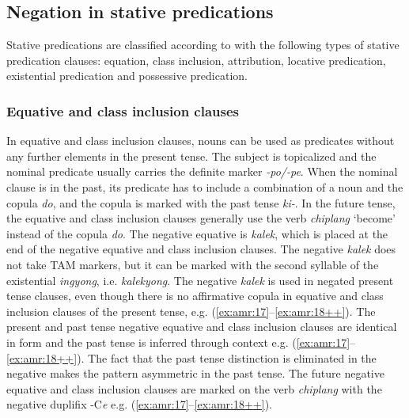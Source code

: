 \documentclass[output=paper,colorlinks,citecolor=brown]{langscibook}
\begin{document}
\subsection{Negation in stative predications}\label{sec:amr:2.3}
Stative predications are classified according to \citet[111]{Payne1997} with the following types of stative predication clauses: equation, class inclusion, attribution, locative predication, existential predication and possessive predication.

\subsubsection{Equative and class inclusion clauses}\label{sec:amr:2.3.1}
In equative and class inclusion clauses, nouns can be used as predicates without any further elements in the present tense. The subject is topicalized and the nominal predicate usually carries the definite marker \textit{{}-po/-pe}. When the nominal clause is in the past, its predicate has to include a combination of a noun and the copula \textit{do}, and the copula is marked with the past tense \textit{ki-}. In the future tense, the equative and class inclusion clauses generally use the verb \textit{chiplang} ‘become’ instead of the copula \textit{do}. The negative equative is \textit{kalek}, which is placed at the end of the negative equative and class inclusion clauses. The negative \textit{kalek} does not take TAM markers, but it can be marked with the second syllable of the existential \textit{ingyong}, i.e. \textit{kalekyong}. The negative \textit{kalek} is used in negated present tense clauses, even though there is no affirmative copula in equative and class inclusion clauses of the present tense, e.g. (\ref{ex:amr:17}--\ref{ex:amr:18++}). The present and past tense negative equative and class inclusion clauses are identical in form and the past tense is inferred through context e.g. (\ref{ex:amr:17}--\ref{ex:amr:18++}). The fact that the past tense distinction is eliminated in the negative makes the pattern asymmetric in the past tense. The future negative equative and class inclusion clauses are marked on the verb \textit{chiplang} with the negative duplifix -C\textit{e} e.g. (\ref{ex:amr:17}--\ref{ex:amr:18++}).
\end{document}
